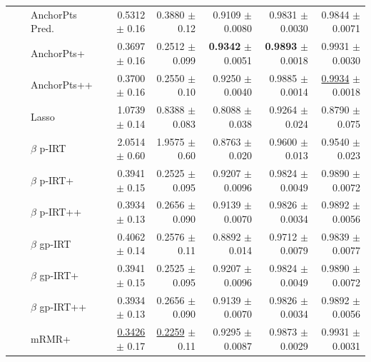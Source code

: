 \begin{longtable}{llp{}rrrrr}
 &  & AnchorPts Pred. & 0.5312 {\scriptsize $\pm$ 0.16} & 0.3880 {\scriptsize $\pm$ 0.12} & 0.9109 {\scriptsize $\pm$ 0.0080} & 0.9831 {\scriptsize $\pm$ 0.0030} & 0.9844 {\scriptsize $\pm$ 0.0071} \\
 &  & AnchorPts+ & 0.3697 {\scriptsize $\pm$ 0.16} & 0.2512 {\scriptsize $\pm$ 0.099} & \textbf{0.9342} {\scriptsize $\pm$ 0.0051} & \textbf{0.9893} {\scriptsize $\pm$ 0.0018} & 0.9931 {\scriptsize $\pm$ 0.0030} \\
 &  & AnchorPts++ & 0.3700 {\scriptsize $\pm$ 0.16} & 0.2550 {\scriptsize $\pm$ 0.10} & 0.9250 {\scriptsize $\pm$ 0.0040} & 0.9885 {\scriptsize $\pm$ 0.0014} & \underline{0.9934} {\scriptsize $\pm$ 0.0018} \\
 &  & Lasso & 1.0739 {\scriptsize $\pm$ 0.14} & 0.8388 {\scriptsize $\pm$ 0.083} & 0.8088 {\scriptsize $\pm$ 0.038} & 0.9264 {\scriptsize $\pm$ 0.024} & 0.8790 {\scriptsize $\pm$ 0.075} \\
 &  & $\beta$ p-IRT & 2.0514 {\scriptsize $\pm$ 0.60} & 1.9575 {\scriptsize $\pm$ 0.60} & 0.8763 {\scriptsize $\pm$ 0.020} & 0.9600 {\scriptsize $\pm$ 0.013} & 0.9540 {\scriptsize $\pm$ 0.023} \\
 &  & $\beta$ p-IRT+ & 0.3941 {\scriptsize $\pm$ 0.15} & 0.2525 {\scriptsize $\pm$ 0.095} & 0.9207 {\scriptsize $\pm$ 0.0096} & 0.9824 {\scriptsize $\pm$ 0.0049} & 0.9890 {\scriptsize $\pm$ 0.0072} \\
 &  & $\beta$ p-IRT++ & 0.3934 {\scriptsize $\pm$ 0.13} & 0.2656 {\scriptsize $\pm$ 0.090} & 0.9139 {\scriptsize $\pm$ 0.0070} & 0.9826 {\scriptsize $\pm$ 0.0034} & 0.9892 {\scriptsize $\pm$ 0.0056} \\
 &  & $\beta$ gp-IRT & 0.4062 {\scriptsize $\pm$ 0.14} & 0.2576 {\scriptsize $\pm$ 0.11} & 0.8892 {\scriptsize $\pm$ 0.014} & 0.9712 {\scriptsize $\pm$ 0.0079} & 0.9839 {\scriptsize $\pm$ 0.0077} \\
 &  & $\beta$ gp-IRT+ & 0.3941 {\scriptsize $\pm$ 0.15} & 0.2525 {\scriptsize $\pm$ 0.095} & 0.9207 {\scriptsize $\pm$ 0.0096} & 0.9824 {\scriptsize $\pm$ 0.0049} & 0.9890 {\scriptsize $\pm$ 0.0072} \\
 &  & $\beta$ gp-IRT++ & 0.3934 {\scriptsize $\pm$ 0.13} & 0.2656 {\scriptsize $\pm$ 0.090} & 0.9139 {\scriptsize $\pm$ 0.0070} & 0.9826 {\scriptsize $\pm$ 0.0034} & 0.9892 {\scriptsize $\pm$ 0.0056} \\
 &  & mRMR+ & \underline{0.3426} {\scriptsize $\pm$ 0.17} & \underline{0.2259} {\scriptsize $\pm$ 0.11} & 0.9295 {\scriptsize $\pm$ 0.0087} & 0.9873 {\scriptsize $\pm$ 0.0029} & 0.9931 {\scriptsize $\pm$ 0.0031} \\

\end{longtable}
